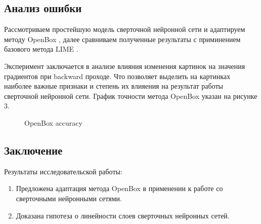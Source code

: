 \documentclass[12pt]{article}
\begin{document}
\newpage

\subsection{Анализ ошибки}

Рассмотриваем простейшую модель сверточной нейронной сети и адаптируем методу OpenBox \cite{chu2019exact}, далее сравниваем полученные результаты с приминением базового метода LIME \cite{ribeiro2016why}. 

Эксперимент заключается в анализе влияния изменения картинок на значения градиентов при backward проходе. Что позволяет выделить на картинках наиболее важные признаки и степень их влияения на результат работы сверточной нейронной сети. График точности метода OpenBox указан на рисунке 3.

\begin{figure}
\caption{OpenBox accuracy}
\label{fig:image2}
\end{figure}

\newpage

\subsection{Заключение}
    \begin{block}{Результаты исследовательской работы:}
    \begin{enumerate}
        \item Предложена адаптация метода OpenBox в применении к работе со сверточными нейронными сетями.
        \item Доказана гипотеза о линейности слоев сверточных нейронных сетей.
    \end{enumerate}
    \end{block}


\end{document}
